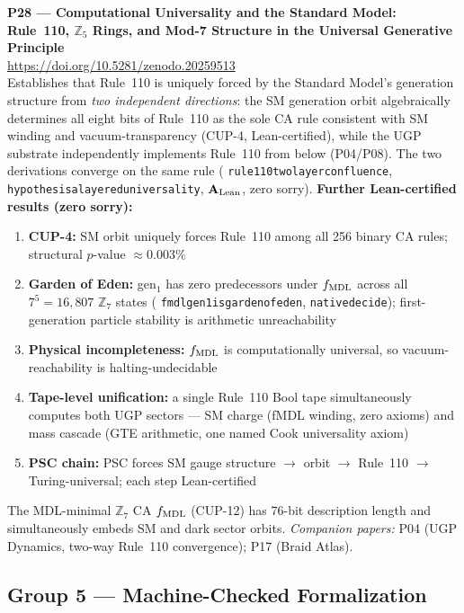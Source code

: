 \documentclass[11pt]{article}
\newcommand{\lean}[1]{%
  \penalty-100
  \begingroup\def\_{{\textunderscore\allowbreak}}\texttt{#1}\endgroup}
\newcommand{\CatAL}{\ensuremath{\textbf{A}_{\rm Lean}}}
\begin{document}
\medskip
\noindent\textbf{P28 — Computational Universality and the Standard Model: Rule~110,
$\mathbb{Z}_5$ Rings, and Mod-7 Structure in the Universal Generative
Principle}~\cite{SpivackCompUniversality}\\
\url{https://doi.org/10.5281/zenodo.20259513}\\
Establishes that Rule~110 is uniquely forced by the Standard Model's generation
structure from \emph{two independent directions}: the SM generation orbit
algebraically determines all eight bits of Rule~110 as the sole CA rule consistent
with SM winding and vacuum-transparency (CUP-4, Lean-certified), while the UGP
substrate independently implements Rule~110 from below (P04/P08).
The two derivations converge on the same rule
(\lean{rule110\_two\_layer\_confluence}, \lean{hypothesis\_a\_layered\_universality},
$\CatAL$, zero sorry).
\textbf{Further Lean-certified results (zero sorry):}
\begin{enumerate}[noitemsep,topsep=2pt]
\item \textbf{CUP-4:} SM orbit uniquely forces Rule~110 among all 256 binary CA rules;
  structural $p$-value $\approx 0.003\%$
\item \textbf{Garden of Eden:} gen$_1$ has zero predecessors under $f_{\rm MDL}$
  across all $7^5 = 16{,}807$ $\mathbb{Z}_7$ states (\lean{fmdl\_gen1\_is\_garden\_of\_eden},
  \lean{native\_decide}); first-generation particle stability is arithmetic unreachability
\item \textbf{Physical incompleteness:} $f_{\rm MDL}$ is computationally universal,
  so vacuum-reachability is halting-undecidable
\item \textbf{Tape-level unification:} a single Rule~110 Bool tape simultaneously
  computes both UGP sectors --- SM charge (fMDL winding, zero axioms) and mass
  cascade (GTE arithmetic, one named Cook universality axiom)
\item \textbf{PSC chain:} PSC forces SM gauge structure $\to$ orbit $\to$ Rule~110
  $\to$ Turing-universal; each step Lean-certified
\end{enumerate}
The MDL-minimal $\mathbb{Z}_7$ CA $f_{\rm MDL}$ (CUP-12) has 76-bit description
length and simultaneously embeds SM and dark sector orbits.
\emph{Companion papers:} P04 (UGP Dynamics, two-way Rule~110 convergence); P17 (Braid Atlas).

\subsection{Group 5 — Machine-Checked Formalization}
\end{document}
